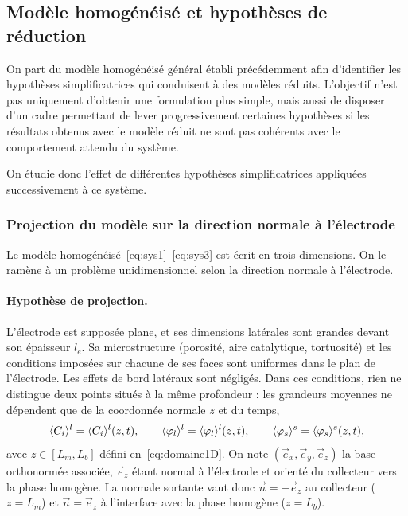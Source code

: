 \subsection*{Modèle homogénéisé et hypothèses de réduction}

On part du modèle homogénéisé général établi précédemment afin
d'identifier les hypothèses simplificatrices qui conduisent à
des modèles réduits. L'objectif n'est pas uniquement d'obtenir
une formulation plus simple, mais aussi de disposer d'un cadre
permettant de lever progressivement certaines hypothèses si les
résultats obtenus avec le modèle réduit ne sont pas cohérents
avec le comportement attendu du système.

On étudie donc l'effet de différentes hypothèses simplificatrices
appliquées successivement à ce système.

\subsubsection*{Projection du modèle sur la direction normale à l'électrode}

Le modèle homogénéisé~\eqref{eq:sys1}--\eqref{eq:sys3} est écrit en
trois dimensions. On le ramène à un problème unidimensionnel selon la
direction normale à l'électrode.

\paragraph{Hypothèse de projection.} L'électrode est supposée plane, et ses
dimensions latérales sont grandes devant son épaisseur $l_e$. Sa
microstructure (porosité, aire catalytique, tortuosité) et les conditions
imposées sur chacune de ses faces sont uniformes dans le plan de l'électrode.
Les effets de bord latéraux sont négligés. Dans ces conditions, rien ne
distingue deux points situés à la même profondeur : les grandeurs moyennes ne
dépendent que de la coordonnée normale $z$ et du temps,
\begin{equation}
\langle C_i \rangle^l = \langle C_i \rangle^l(z,t), \qquad
\langle \varphi_l \rangle^l = \langle \varphi_l \rangle^l(z,t), \qquad
\langle \varphi_s \rangle^s = \langle \varphi_s \rangle^s(z,t),
\end{equation}
avec $z \in [L_m, L_b]$ défini en~\eqref{eq:domaine1D}. On note
$(\vec{e}_x, \vec{e}_y, \vec{e}_z)$ la base orthonormée associée, $\vec{e}_z$
étant normal à l'électrode et orienté du collecteur vers la phase homogène.
La normale sortante vaut donc $\vec{n} = -\vec{e}_z$ au collecteur
($z = L_m$) et $\vec{n} = \vec{e}_z$ à l'interface avec la phase homogène
($z = L_b$).

